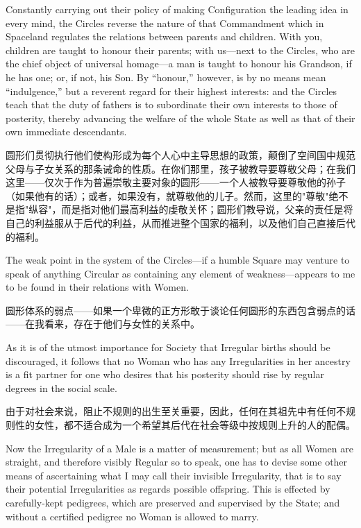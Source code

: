 \documentclass[12pt,UTF8]{ctexbook}
\begin{document}
Constantly carrying out their policy of making Configuration the leading idea in every mind, the Circles reverse the nature of that Commandment which in Spaceland regulates the relations between parents and children. With you, children are taught to honour their parents; with us---next to the Circles, who are the chief object of universal homage---a man is taught to honour his Grandson, if he has one; or, if not, his Son. By ``honour,'' however, is by no means mean ``indulgence,'' but a reverent regard for their highest interests: and the Circles teach that the duty of fathers is to subordinate their own interests to those of posterity, thereby advancing the welfare of the whole State as well as that of their own immediate descendants.

圆形们贯彻执行他们使构形成为每个人心中主导思想的政策，颠倒了空间国中规范父母与子女关系的那条诫命的性质。在你们那里，孩子被教导要尊敬父母；在我们这里——仅次于作为普遍崇敬主要对象的圆形——一个人被教导要尊敬他的孙子（如果他有的话）；或者，如果没有，就尊敬他的儿子。然而，这里的"尊敬"绝不是指"纵容"，而是指对他们最高利益的虔敬关怀；圆形们教导说，父亲的责任是将自己的利益服从于后代的利益，从而推进整个国家的福利，以及他们自己直接后代的福利。

The weak point in the system of the Circles---if a humble Square may venture to speak of anything Circular as containing any element of weakness---appears to me to be found in their relations with Women.

圆形体系的弱点——如果一个卑微的正方形敢于谈论任何圆形的东西包含弱点的话——在我看来，存在于他们与女性的关系中。

As it is of the utmost importance for Society that Irregular births should be discouraged, it follows that no Woman who has any Irregularities in her ancestry is a fit partner for one who desires that his posterity should rise by regular degrees in the social scale.

由于对社会来说，阻止不规则的出生至关重要，因此，任何在其祖先中有任何不规则性的女性，都不适合成为一个希望其后代在社会等级中按规则上升的人的配偶。

Now the Irregularity of a Male is a matter of measurement; but as all Women are straight, and therefore visibly Regular so to speak, one has to devise some other means of ascertaining what I may call their invisible Irregularity, that is to say their potential Irregularities as regards possible offspring. This is effected by carefully-kept pedigrees, which are preserved and supervised by the State; and without a certified pedigree no Woman is allowed to marry.
\end{document}
